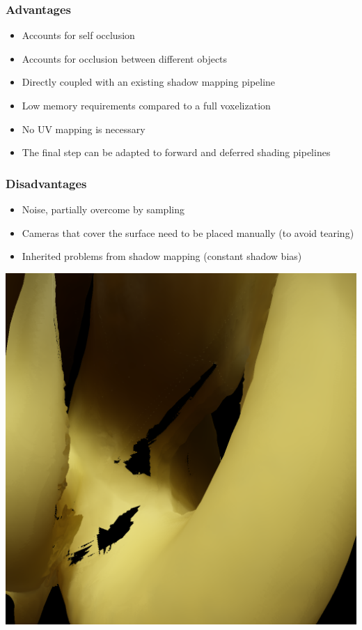 \documentclass{beamer}
\begin{document}
\begin{frame}
    \frametitle{Advantages}
\begin{itemize}
	\item Accounts for self occlusion
	\item Accounts for occlusion between different objects
	\item Directly coupled with an existing shadow mapping pipeline
	\item Low memory requirements compared to a full voxelization
	\item No UV mapping is necessary
	\item The final step can be adapted to forward and deferred shading pipelines
\end{itemize}
\end{frame}


\begin{frame}
    \frametitle{Disadvantages}
\begin{itemize}
	\item Noise, partially overcome by sampling
	\item Cameras that cover the surface need to be placed manually (to avoid tearing)
	\item Inherited problems from shadow mapping (constant shadow bias)
\end{itemize}
	\centering
	\includegraphics[width=0.3 \textwidth]{tearing}
\end{frame}
\end{document}
